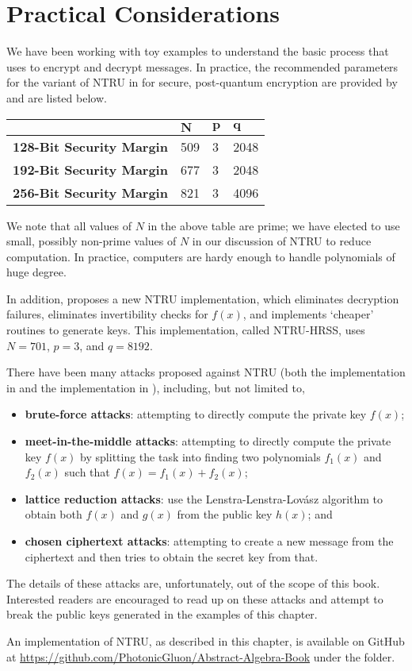 \newpage

\section{Practical Considerations}
We have been working with toy examples to understand the basic process that \cite{hoffstein_pipher_silverman_1998} uses to encrypt and decrypt messages. In practice, the recommended parameters for the variant of NTRU in \cite{hoffstein_pipher_silverman_1998} for secure, post-quantum encryption are provided by \cite{ntru_2020} and are listed below.
\begin{table}[H]
    \centering
    \begin{tabular}{|l|l|l|l|}
        \hline
        & $\boldsymbol{N}$ & $\boldsymbol{p}$ & $\boldsymbol{q}$ \\ \hline
        \textbf{128-Bit Security Margin} & 509 & 3 & 2048 \\ \hline
        \textbf{192-Bit Security Margin} & 677 & 3 & 2048 \\ \hline
        \textbf{256-Bit Security Margin} & 821 & 3 & 4096 \\ \hline
    \end{tabular}
\end{table}

We note that all values of $N$ in the above table are prime; we have elected to use small, possibly non-prime values of $N$ in our discussion of NTRU to reduce computation. In practice, computers are hardy enough to handle polynomials of huge degree.

In addition, \cite{hulsing_rijneveld_schanck_schwabe_2018} proposes a new NTRU implementation, which eliminates decryption failures, eliminates invertibility checks for $f(x)$, and implements `cheaper' routines to generate keys. This implementation, called NTRU-HRSS, uses $N = 701$, $p = 3$, and $q = 8192$.

There have been many attacks proposed against NTRU (both the implementation in \cite{hoffstein_pipher_silverman_1996} and the implementation in \cite{hulsing_rijneveld_schanck_schwabe_2018}), including, but not limited to,
\begin{itemize}
    \item \textbf{brute-force attacks}: attempting to directly compute the private key $f(x)$;
    \item \textbf{meet-in-the-middle attacks}: attempting to directly compute the private key $f(x)$ by splitting the task into finding two polynomials $f_1(x)$ and $f_2(x)$ such that $f(x) = f_1(x) + f_2(x)$;
    \item \textbf{lattice reduction attacks}: use the Lenstra-Lenstra-Lov\'asz algorithm to obtain both $f(x)$ and $g(x)$ from the public key $h(x)$; and
    \item \textbf{chosen ciphertext attacks}: attempting to create a new message from the ciphertext and then tries to obtain the secret key from that.
\end{itemize}
The details of these attacks are, unfortunately, out of the scope of this book. Interested readers are encouraged to read up on these attacks and attempt to break the public keys generated in the examples of this chapter.

An implementation of NTRU, as described in this chapter, is available on GitHub at \url{https://github.com/PhotonicGluon/Abstract-Algebra-Book} under the  folder.
